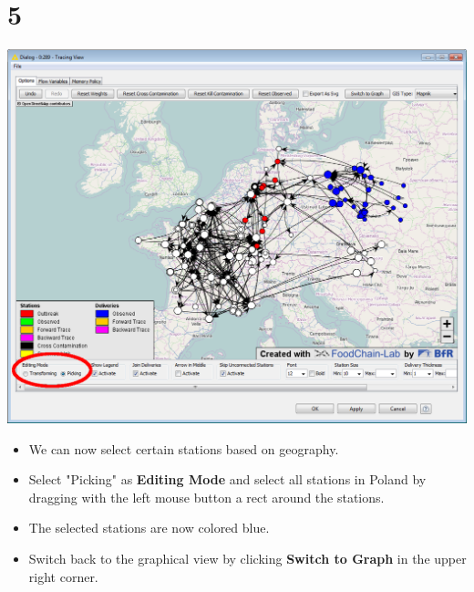 \documentclass{beamer}
\begin{document}
\section{5}
\begin{frame}
	\begin{center}
  		\includegraphics[height=0.55\textheight]{5.png}
	\end{center}
	\begin{itemize}
		\item We can now select certain stations based on geography.
		\item Select "Picking" as \textbf{Editing Mode} and select all stations in Poland by dragging with the left mouse button a rect around the stations.
		\item The selected stations are now colored blue.
		\item Switch back to the graphical view by clicking \textbf{Switch to Graph} in the upper right corner.
	\end{itemize}
\end{frame}
\end{document}
